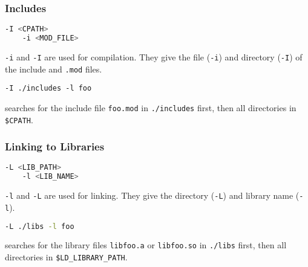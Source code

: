 \begin{frame}[fragile]
    \frametitle{Includes}
    \begin{lstlisting}[language=bash]
    -I <CPATH>
    -i <MOD_FILE>
    \end{lstlisting}
    \texttt{-i} and \texttt{-I} are used for compilation. They give the file (\texttt{-i}) and directory (\texttt{-I}) of the include and \texttt{.mod} files.

    \begin{lstlisting}[numbers=none]
    -I ./includes -l foo
    \end{lstlisting}
    searches for the include file \texttt{foo.mod} in \texttt{./includes} first, then all directories in \texttt{\$CPATH}.
\end{frame}
\begin{frame}[fragile]
    \frametitle{Linking to Libraries}
    \begin{lstlisting}[language=bash]
    -L <LIB_PATH>
    -l <LIB_NAME>
    \end{lstlisting}
    \texttt{-l} and \texttt{-L} are used for linking. They give the directory (\texttt{-L}) and library name (\texttt{-l}). 

    \begin{lstlisting}[language=bash]
    -L ./libs -l foo
    \end{lstlisting}
    searches for the library files \texttt{libfoo.a} or \texttt{libfoo.so} in \texttt{./libs} first, then all directories in \texttt{\$LD\_LIBRARY\_PATH}.
\end{frame}
